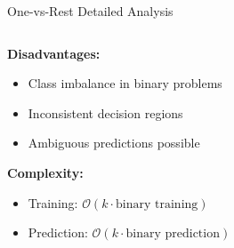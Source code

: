 \documentclass[8pt,aspectratio=1610]{beamer}
\begin{document}
\begin{frame}{One-vs-Rest Detailed Analysis}
\begin{columns}[t]
\begin{column}{0.48\textwidth}
\vspace{0.3cm}
\textbf{Disadvantages:}
\begin{itemize}
\setlength{\itemsep}{1pt}
\item Class imbalance in binary problems
\item Inconsistent decision regions
\item Ambiguous predictions possible
\end{itemize}

\vspace{0.3cm}
\textbf{Complexity:}
\begin{itemize}
\setlength{\itemsep}{1pt}
\item Training: $\mathcal{O}(k \cdot \text{binary training})$
\item Prediction: $\mathcal{O}(k \cdot \text{binary prediction})$
\end{itemize}
\end{column}
\end{columns}
\end{frame}
\end{document}
